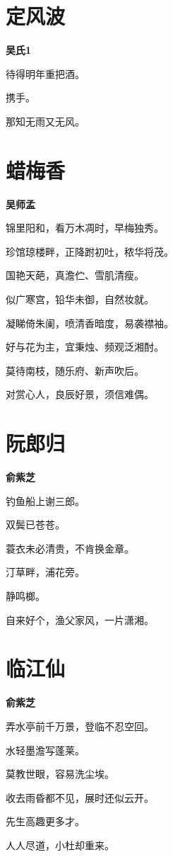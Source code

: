 \documentclass[12pt,a4paper]{ctexbook}
\begin{document}
\section{定风波}
\textbf{吴氏1}\par\vspace{0.5em}
待得明年重把酒。\par
携手。\par
那知无雨又无风。\par

\section{蜡梅香}
\textbf{吴师孟}\par\vspace{0.5em}
锦里阳和，看万木凋时，早梅独秀。\par
珍馆琼楼畔，正降跗初吐，秾华将茂。\par
国艳天葩，真澹伫、雪肌清瘦。\par
似广寒宫，铅华未御，自然妆就。\par
凝睇倚朱阑，喷清香暗度，易袭襟袖。\par
好与花为主，宜秉烛、频观泛湘酎。\par
莫待南枝，随乐府、新声吹后。\par
对赏心人，良辰好景，须信难偶。\par

\section{阮郎归}
\textbf{俞紫芝}\par\vspace{0.5em}
钓鱼船上谢三郎。\par
双鬓已苍苍。\par
蓑衣未必清贵，不肯换金章。\par
汀草畔，浦花旁。\par
静鸣榔。\par
自来好个，渔父家风，一片潇湘。\par

\section{临江仙}
\textbf{俞紫芝}\par\vspace{0.5em}
弄水亭前千万景，登临不忍空回。\par
水轻墨澹写蓬莱。\par
莫教世眼，容易洗尘埃。\par
收去雨昏都不见，展时还似云开。\par
先生高趣更多才。\par
人人尽道，小杜却重来。\par
\end{document}
